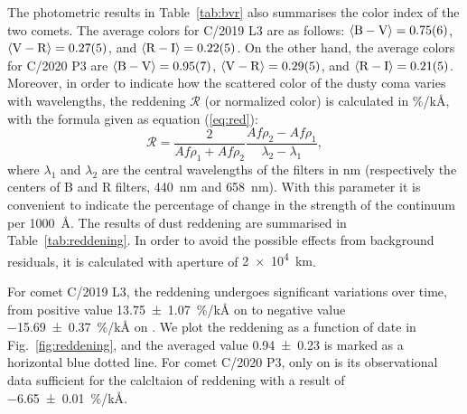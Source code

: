 The photometric results in Table~\ref{tab:bvr} also summarises the color index of the two comets. 
The average colors for C/2019 L3 are as follows: 
$\langle \mathrm{B} - \mathrm{V} \rangle = \num{0.75 +- 0.06}$, 
$\langle \mathrm{V} - \mathrm{R} \rangle = \num{0.27 +- 0.05}$, and 
$\langle \mathrm{R} - \mathrm{I} \rangle = \num{0.22 +- 0.05}$. 
On the other hand, the average colors for C/2020 P3 are 
$\langle \mathrm{B} - \mathrm{V} \rangle = \num{0.95 +- 0.07}$, 
$\langle \mathrm{V} - \mathrm{R} \rangle = \num{0.29 +- 0.05}$, and 
$\langle \mathrm{R} - \mathrm{I} \rangle = \num{0.21 +- 0.05}$. 
Moreover, in order to indicate how the scattered color of the dusty coma varies with wavelengths, the reddening $\mathcal{R}$ (or normalized color) \citep{jewitt_cometary_1986, lara_behaviour_2003, mazzotta_epifani_dust_2011, shi_ccd_2015} is calculated in \si{\percent/\kilo\angstrom}, with the formula given as equation (\ref{eq:red}): 
\begin{equation}
\mathcal{R} = \frac{2}{Af\rho_1 + Af\rho_2} \frac{Af\rho_2 - Af\rho_1}{\lambda_2 - \lambda_1}, 
\label{eq:red}
\end{equation}
where $\lambda_1$ and $\lambda_2$ are the central wavelengths of the filters in \si{\nm} (respectively the centers of B and R filters, {\SI{440}{\nm}} and {\SI{658}{\nm}}). With this parameter it is convenient to indicate the percentage of change in the strength of the continuum per {\SI{1000}{\angstrom}}. The results of dust reddening are summarised in Table~\ref{tab:reddening}. In order to avoid the possible effects from background residuals, it is calculated with aperture of {\SI{2e4}{\km}}. 

For comet C/2019 L3, the reddening undergoes significant variations over time, from positive value {\SI{13.75 +- 1.07}{\percent/\kilo\angstrom}} on  to negative value {\SI{-15.69 +- 0.37}{\percent/\kilo\angstrom}} on . We plot the reddening as a function of date in Fig.~\ref{fig:reddening}, and the averaged value \num{0.94 +- 0.23} is marked as a horizontal blue dotted line. For comet C/2020 P3, only on  is its observational data sufficient for the calcltaion of reddening with a result of {\SI{-6.65 +- 0.01}{\percent/\kilo\angstrom}}. 

